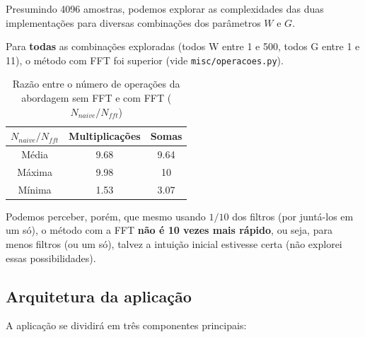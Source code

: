 Presumindo 4096 amostras, podemos explorar as complexidades das duas implementações para diversas combinações dos parâmetros $W$ e $G$.

Para \textbf{todas} as combinações exploradas (todos W entre 1 e 500, todos G entre 1 e 11), o método com FFT foi superior (vide \texttt{misc/operacoes.py}).

\begin{table}[h!]
    \begin{center}
        \begin{tabular}{ |c|c|c| }
        \hline
         $N_{naive}/N_{fft}$ & \textbf{Multiplicações} & \textbf{Somas} \\ 
        \hline
        Média & 9.68 & 9.64 \\  
        Máxima & 9.98 & 10 \\
        Mínima & 1.53 & 3.07 \\
        \hline
        \end{tabular}
        \caption{Razão entre o número de operações da abordagem sem FFT e com FFT ($N_{naive}/N_{fft}$)}
    \end{center}
\end{table}

Podemos perceber, porém, que mesmo usando $1/10$ dos filtros (por juntá-los em um só), o método com a FFT \textbf{não é 10 vezes mais rápido}, ou seja, para menos filtros (ou um só), talvez a intuição inicial estivesse certa (não explorei essas possibilidades).

\subsection{Arquitetura da aplicação}

A aplicação se dividirá em três componentes principais:

